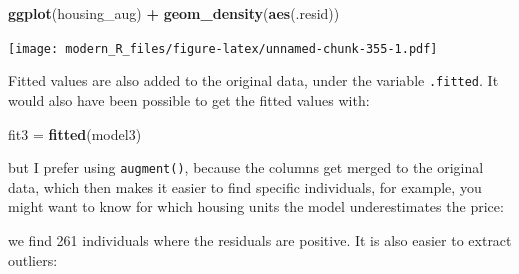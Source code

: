 \documentclass[]{gitbook}
\newenvironment{Shaded}{\begin{snugshade}}{\end{snugshade}}
\newcommand{\DataTypeTok}[1]{\textcolor[rgb]{0.13,0.29,0.53}{#1}}
\newcommand{\DecValTok}[1]{\textcolor[rgb]{0.00,0.00,0.81}{#1}}
\newcommand{\FloatTok}[1]{\textcolor[rgb]{0.00,0.00,0.81}{#1}}
\newcommand{\KeywordTok}[1]{\textcolor[rgb]{0.13,0.29,0.53}{\textbf{#1}}}
\newcommand{\NormalTok}[1]{#1}
\newcommand{\OperatorTok}[1]{\textcolor[rgb]{0.81,0.36,0.00}{\textbf{#1}}}
\newcommand{\StringTok}[1]{\textcolor[rgb]{0.31,0.60,0.02}{#1}}
\theoremstyle{definition}
\theoremstyle{definition}
\theoremstyle{definition}
\theoremstyle{remark}
\begin{document}
\begin{Shaded}
\begin{Highlighting}[]
\KeywordTok{ggplot}\NormalTok{(housing_aug) }\OperatorTok{+}
\StringTok{  }\KeywordTok{geom_density}\NormalTok{(}\KeywordTok{aes}\NormalTok{(.resid))}
\end{Highlighting}
\end{Shaded}

\texttt{[image: modern\_R\_files/figure-latex/unnamed-chunk-355-1.pdf]}

Fitted values are also added to the original data, under the variable
\texttt{.fitted}. It would also have been possible to get the fitted
values with:

\begin{Shaded}
\begin{Highlighting}[]
\NormalTok{fit3 =}\StringTok{ }\KeywordTok{fitted}\NormalTok{(model3)}
\end{Highlighting}
\end{Shaded}

but I prefer using \texttt{augment()}, because the columns get merged to
the original data, which then makes it easier to find specific
individuals, for example, you might want to know for which housing units
the model underestimates the price:

\begin{Shaded}
\end{Shaded}

we find 261 individuals where the residuals are positive. It is also
easier to extract outliers:

\begin{Shaded}
\end{Shaded}
\end{document}
